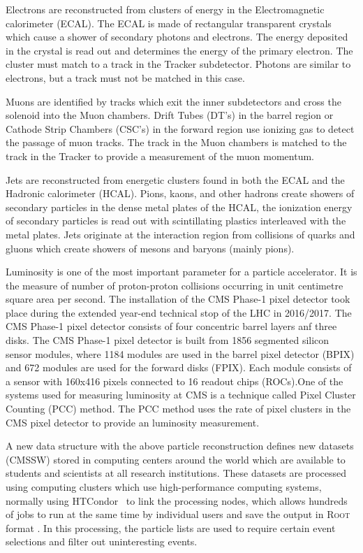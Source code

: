 \documentclass[final,3p]{CSP}
\begin{document}
Electrons are reconstructed from clusters of energy in the Electromagnetic calorimeter (ECAL). The ECAL is made of rectangular transparent crystals which cause a shower of secondary photons and electrons. The energy deposited in the crystal is read out and determines the energy of the primary electron. The cluster must match to a track in the Tracker subdetector. Photons are similar to electrons, but a track must not be matched in this case.

Muons are identified by tracks which exit the inner subdetectors and cross the solenoid into the Muon chambers. Drift Tubes (DT's) in the barrel region or Cathode Strip Chambers (CSC's) in the forward region use ionizing gas to detect the passage of muon tracks.  The track in the Muon chambers is matched to the track in the Tracker to provide a measurement of the muon momentum.

Jets are reconstructed from energetic clusters found in both the ECAL and the Hadronic calorimeter (HCAL).
Pions, kaons, and other hadrons create showers of secondary particles in the dense metal plates of the HCAL, the ionization energy of secondary particles is read out with scintillating plastics interleaved with the metal plates.  
Jets originate at the interaction region from collisions of quarks and gluons which create showers of mesons and baryons (mainly pions).


Luminosity is one of the most important parameter for a particle accelerator. It is the measure of number of proton-proton collisions occurring in unit centimetre square area per second. The installation of the CMS Phase-1 pixel detector took place during the extended year-end technical stop of the LHC in 2016/2017. The CMS Phase-1 pixel detector consists of four concentric barrel layers anf three disks. The CMS Phase-1 pixel detector is built from 1856 segmented silicon sensor modules,
where 1184 modules are used in the barrel pixel detector (BPIX) and 672 modules are used for the forward disks (FPIX). Each module consists of a sensor with 160x416 pixels connected to 16 readout chips (ROCs).One of the systems used for measuring luminosity at CMS is a technique called Pixel Cluster Counting (PCC) method. The PCC method uses the rate of pixel clusters in the CMS pixel detector to provide an luminosity measurement.

A new data structure with the above particle reconstruction defines new  datasets (\textsc{CMSSW}) stored in computing centers around the world which are available to students and scientists at all research institutions.
These  datasets are processed using computing clusters which use high-performance computing systems, normally using HTCondor~\cite{HTCondor} to link the processing nodes, which allows hundreds of jobs to run at the same time by individual users and save the output in \textsc{Root} format \cite{brun2003root}.
In this processing, the particle lists are used to require certain event selections and filter out uninteresting events.
\end{document}
